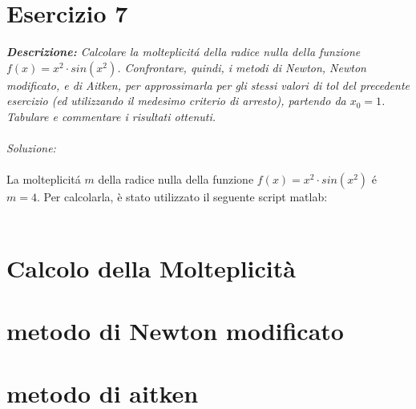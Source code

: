 \section{Esercizio 7}

\textit{\textbf{Descrizione:} Calcolare la molteplicit\'a della radice nulla della funzione $f(x) = x^{2} \cdot sin(x^{2})$. Confrontare, quindi, i metodi di Newton, Newton modificato, e di Aitken, per approssimarla per gli stessi valori di tol del precedente esercizio (ed utilizzando il medesimo criterio di arresto), partendo da $x_{0}=1$. Tabulare e commentare i risultati ottenuti.}\\~\\
\emph{Soluzione:}\\~\\
La molteplicit\'a $m$ della radice nulla della funzione $f(x) = x^{2} \cdot sin(x^{2})$  \'e $m=4$. Per calcolarla, è stato utilizzato il seguente script matlab:
\\~\\

\section*{Calcolo della Molteplicità}

\newpage

\section*{metodo di  Newton modificato}

\newpage

\section*{metodo di aitken}

\newpage
